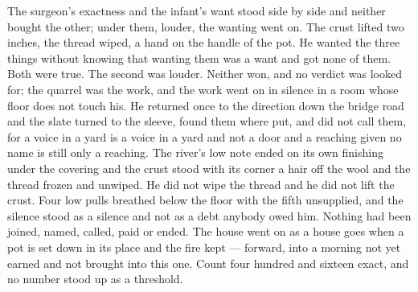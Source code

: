 The surgeon's exactness and the infant's want stood side by side and neither bought the other; under them, louder, the wanting went on. The crust lifted two inches, the thread wiped, a hand on the handle of the pot. He wanted the three things without knowing that wanting them was a want and got none of them. Both were true. The second was louder. Neither won, and no verdict was looked for; the quarrel was the work, and the work went on in silence in a room whose floor does not touch his. He returned once to the direction down the bridge road and the slate turned to the sleeve, found them where put, and did not call them, for a voice in a yard is a voice in a yard and not a door and a reaching given no name is still only a reaching. The river's low note ended on its own finishing under the covering and the crust stood with its corner a hair off the wool and the thread frozen and unwiped. He did not wipe the thread and he did not lift the crust. Four low pulls breathed below the floor with the fifth unsupplied, and the silence stood as a silence and not as a debt anybody owed him. Nothing had been joined, named, called, paid or ended. The house went on as a house goes when a pot is set down in its place and the fire kept --- forward, into a morning not yet earned and not brought into this one. Count four hundred and sixteen exact, and no number stood up as a threshold.
